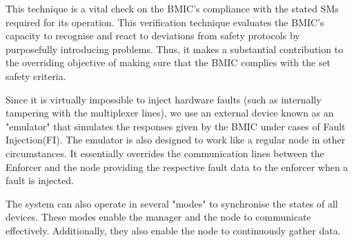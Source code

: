 This technique is a vital check on the BMIC's compliance with the stated SMs required for its operation. This verification technique evaluates the BMIC's capacity to recognise and react to deviations from safety protocols by purposefully introducing problems. Thus, it makes a substantial contribution to the overriding objective of making sure that the BMIC complies with the set safety criteria.

Since it is virtually impossible to inject hardware faults (such as internally tampering with the multiplexer lines), we use an external device known as an "emulator" that simulates the responses given by the BMIC under cases of Fault Injection(FI). The emulator is also designed to work like a regular node in other circumstances. It essentially overrides the communication lines between the Enforcer and the node providing the respective fault data to the enforcer when a fault is injected.

The system can also operate in several "modes" to synchronise the states of all devices. These modes enable the manager and the node to communicate effectively. Additionally, they also enable the node to continuously gather data.
